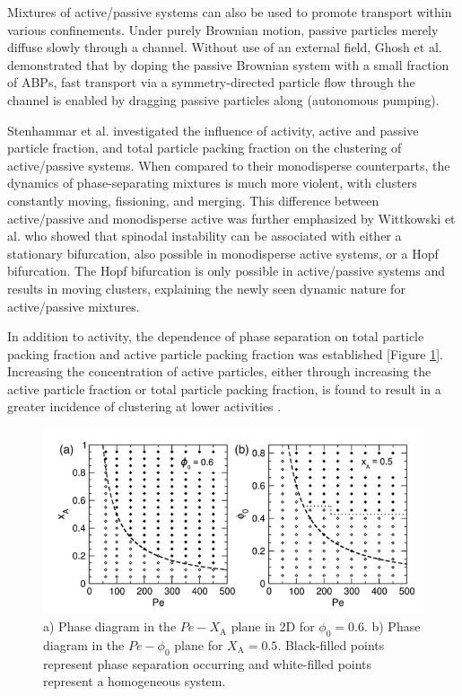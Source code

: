 \documentclass[11pt]{article}
\begin{document}
Mixtures of active/passive systems can also be used to promote transport within various confinements. Under purely Brownian motion, passive particles merely diffuse slowly through a channel.  Without use of an external field, Ghosh et al. \cite{Ghosh} demonstrated that by doping the passive Brownian system with a small fraction of ABPs, fast transport via a symmetry-directed particle flow through the channel is enabled by dragging passive particles along (autonomous pumping).

Stenhammar et al. \cite{Stenhammar2} investigated the influence of activity, active and passive particle fraction, and total particle packing fraction on the clustering of active/passive systems. When compared to their monodisperse counterparts, the dynamics of phase-separating mixtures is much more violent, with clusters constantly moving, fissioning, and merging.  This difference between active/passive and monodisperse active was further emphasized by Wittkowski et al. \cite{Wittkowski} who showed that spinodal instability can be associated with either a stationary bifurcation, also possible in monodisperse active systems, or a Hopf bifurcation.  The Hopf bifurcation is only possible in active/passive systems and results in moving clusters, explaining the newly seen dynamic nature for active/passive mixtures.

In addition to activity, the dependence of phase separation on total particle packing fraction and active particle packing fraction was established [Figure \ref{fig:binodal}]. Increasing the concentration of active particles, either through increasing the active particle fraction or total particle packing fraction, is found to result in a greater incidence of clustering at lower activities \cite{Stenhammar2}.  

\begin{figure}[ht]
\centering\includegraphics[width=0.9\linewidth]{Screen Shot 2020-08-10 at 9.39.25 AM.png}
\caption{a) Phase diagram in the $Pe-X_\text{A}$ plane in 2D for $\phi_0=0.6$. b) Phase diagram in the $Pe-\phi_0$ plane for $X_\text{A}=0.5$.  Black-filled points represent phase separation occurring and white-filled points represent a homogeneous system. \cite{Stenhammar2} }
\label{fig:binodal}
\end{figure}
\end{document}
